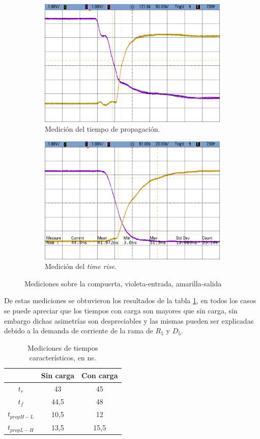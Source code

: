 \begin{figure}[H]
\begin{subfigure}{.5\textwidth}
  \centering
  \includegraphics[width=.85\linewidth]{figs/EJ4/HC_Prop.png}  
  \caption{Medici\'on del tiempo de propagaci\'on.}
  \label{ej4_fig:HC_prop}
\end{subfigure}
\begin{subfigure}{.5\textwidth}
  \centering
  \includegraphics[width=.85\linewidth]{figs/EJ4/HC_TR.png}  
  \caption{Medici\'on del \textit{time rise}.}
  \label{ej4_fig:HC_rise}
\end{subfigure}
\caption{Mediciones sobre la compuerta, violeta-entrada, amarilla-salida}
\label{ej4_fig:HC}
\end{figure}
De estas mediciones se obtuvieron los resultados de la tabla \ref{ej4:table_times}, en todos los casos se puede apreciar que los tiempos con carga son mayores que sin carga, sin embargo dichas asimetr\'ias son despreciables y las mismas pueden ser explicadas debido a la demanda de corriente de la rama de $R_5$ y $D_5$. 
\begin{table}[H]
\centering
\begin{tabular}{|c||c|c|}
\hline
          & Sin carga & Con carga \\ \hline \hline
$t_r$     & 43       & 45       \\
$t_f$     & 44,5     & 48       \\
$t_{prop H-L}$ & 10,5     & 12      \\
$t_{prop L-H}$ & 13,5     & 15,5     \\ \hline
\end{tabular}
\caption{Mediciones de tiempos caracter\'isticos, en ns.}
\label{ej4:table_times}
\end{table}
